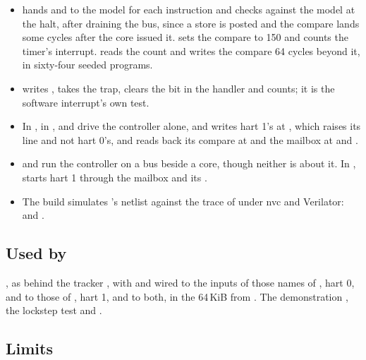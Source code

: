 \begin{itemize}
\item {} hands  and
 to the model for each instruction and checks
 against the model at the halt, after draining the bus,
since a store is posted and the compare lands some cycles after the
core issued it.  sets the compare to 150 and counts
the timer's interrupt.  reads the count and
writes the compare 64 cycles beyond it, in sixty-four seeded programs.
\item {} writes
, takes the trap, clears the bit in the handler and counts;
it is the software interrupt's own test.
\item In , in ,
 and
\allowbreak
{} drive the
controller alone, and 
writes hart 1's  at , which raises its line
and not hart 0's, and reads back its compare at  and the
mailbox at  and .
\item {} and 
run the controller on a bus beside a core, though neither is about it.
In , \allowbreak
{}
starts hart 1 through the mailbox and its .
\item The build simulates 's netlist against the trace
of  under nvc and Verilator:
 and
.
\end{itemize}

\subsection*{Used by}

, as  behind the tracker , with
 and  wired to the inputs of those names of
, hart 0,  and  to those of
, hart 1, and  to both, in the 64\,KiB from
. The demonstration
, the lockstep test and .

\subsection*{Limits}

